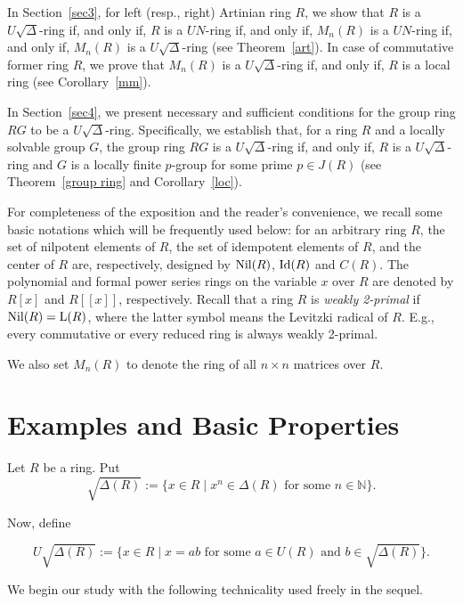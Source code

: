 \documentclass[11pt]{amsart}
\theoremstyle{definition}
\begin{document}
In Section~\ref{sec3}, for left (resp., right) Artinian ring $R$, we show that $R$ is a $U\sqrt{\Delta}$-ring if, and only if, $R$ is a $UN$-ring if, and only if, $M_n(R)$ is a $UN$-ring if, and only if, $M_n(R)$ is a $U\sqrt{\Delta}$-ring (see Theorem~\ref{art}). In case of commutative former ring $R$, we prove that $M_n(R)$ is a $U\sqrt{\Delta}$-ring if, and only if, $R$ is a local ring (see Corollary~\ref{mm}).

In Section~\ref{sec4}, we present necessary and sufficient conditions for the group ring $RG$ to be a $U\sqrt{\Delta}$-ring. Specifically, we establish that, for a ring $R$ and a locally solvable group $G$, the group ring $RG$ is a $U\sqrt{\Delta}$-ring if, and only if, $R$ is a $U\sqrt{\Delta}$-ring and $G$ is a locally finite $p$-group for some prime $p \in J(R)$ (see Theorem~\ref{group ring} and Corollary~\ref{loc}).

\medskip

For completeness of the exposition and the reader's convenience, we recall some basic notations which will be frequently used below: for an arbitrary ring $R$, the set of nilpotent elements of $R$, the set of idempotent elements of $R$, and the center of $R$ are, respectively, designed by ${\rm Nil}(R)$, ${\rm Id}(R)$ and $C(R)$. The polynomial and formal power series rings on the variable $x$ over $R$ are denoted by $R[x]$ and $R[[x]]$, respectively. Recall that a ring $R$ is {\it weakly 2-primal} if ${\rm Nil}(R) = {\rm L}(R)$, where the latter symbol means the Levitzki radical of $R$. E.g., every commutative or every reduced ring is always weakly 2-primal.

We also set $M_n(R)$ to denote the ring of all $n\times n$ matrices over $R$.

\section{Examples and Basic Properties}\label{sec2}

Let $R$ be a ring. Put
$$\sqrt{\Delta(R)} := \{ x \in R \mid   x^n \in \Delta(R) \text{ for some } n \in \mathbb{N} \}.$$

Now, define

$$U\sqrt{\Delta(R)} := \{ x \in R \mid x = ab \text{ for some } a \in U(R) \text{ and } b \in \sqrt{\Delta(R)} \}.$$


We begin our study with the following technicality used freely in the sequel.
\end{document}
